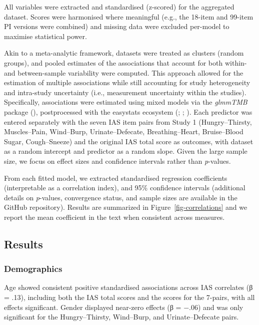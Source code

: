 \documentclass[
  jou,
  floatsintext,
  longtable,
  nolmodern,
  notxfonts,
  notimes,
  colorlinks=true,linkcolor=blue,citecolor=blue,urlcolor=blue]{apa7}
\begin{document}
All variables were extracted and standardised (z-scored) for the
aggregated dataset. Scores were harmonised where meaningful (e.g., the
18-item and 99-item PI versions were combined) and missing data were
excluded per-model to maximise statistical power.

Akin to a meta-analytic framework, datasets were treated as clusters
(random groups), and pooled estimates of the associations that account
for both within- and between-sample variability were computed. This
approach allowed for the estimation of multiple associations while still
accounting for study heterogeneity and intra-study uncertainty (i.e.,
measurement uncertainty within the studies). Specifically, associations
were estimated using mixed models via the \emph{glmmTMB} package
(), postprocessed with
the easystats ecosystem (; ;
). Each predictor was entered separately with the seven IAS item
pairs from Study 1 (Hungry--Thirsty, Muscles--Pain, Wind--Burp,
Urinate--Defecate, Breathing--Heart, Bruise--Blood Sugar, Cough--Sneeze)
and the original IAS total score as outcomes, with dataset as a random
intercept and predictor as a random slope. Given the large sample size,
we focus on effect sizes and confidence intervals rather than
\emph{p}-values.

From each fitted model, we extracted standardised regression
coefficients (interpretable as a correlation index), and 95\% confidence
intervals (additional details on \emph{p}-values, convergence status,
and sample sizes are available in the GitHub repository). Results are
summarized in Figure~\ref{fig-correlations} and we report the mean
coefficient in the text when consistent across measures.

\subsection{Results}\label{results-1}

\subsubsection{Demographics}\label{demographics}

Age showed consistent positive standardised associations across IAS
correlates (β = .13), including both the IAS total scores and the scores
for the 7-pairs, with all effects significant. Gender displayed
near-zero effects (β = −.06) and was only significant for the
Hungry--Thirsty, Wind--Burp, and Urinate--Defecate pairs.
\end{document}
